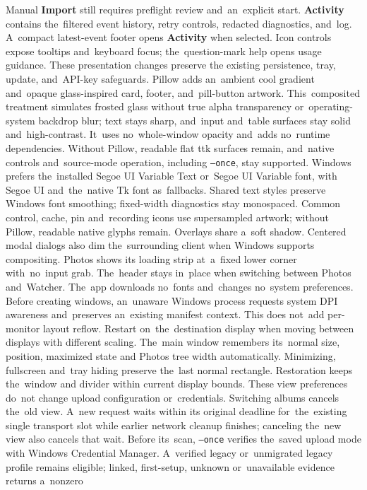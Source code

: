 \documentclass[11pt,a4paper]{article}
\newcommand{\ui}[1]{\textbf{#1}}
\begin{document}
Manual \ui{Import} still requires preflight review and~an~explicit start.
\ui{Activity} contains the~filtered event history, retry controls, redacted
diagnostics, and~log. A~compact latest-event footer opens \ui{Activity} when
selected. Icon controls expose tooltips and~keyboard focus; the~question-mark
help
opens usage guidance. These presentation changes preserve the
existing persistence, tray, update, and~API-key safeguards.
Pillow adds an~ambient cool gradient and~opaque glass-inspired card, footer,
and~pill-button artwork. This~composited treatment simulates frosted glass
without true alpha transparency or~operating-system backdrop blur; text stays
sharp, and~input and~table surfaces stay solid and~high-contrast. It~uses
no~whole-window
opacity and~adds no~runtime dependencies. Without Pillow, readable flat ttk
surfaces remain, and~native controls and~source-mode operation, including
\texttt{--once}, stay supported.
Windows prefers the~installed Segoe UI Variable Text or~Segoe UI Variable
font, with Segoe UI and~the~native Tk font as~fallbacks. Shared text styles preserve Windows
font smoothing; fixed-width diagnostics stay monospaced. Common control,
cache, pin and~recording icons use supersampled artwork; without Pillow,
readable native glyphs remain. Overlays share a~soft shadow. Centered modal
dialogs also dim the~surrounding client when Windows supports compositing.
Photos shows its loading strip at~a~fixed lower corner with~no~input grab.
The~header stays in~place when switching between Photos and~Watcher.
The~app downloads no~fonts and~changes
no~system preferences. Before creating windows, an~unaware Windows process
requests system DPI awareness and~preserves an~existing manifest context.
This does not~add per-monitor layout reflow. Restart on~the~destination
display when moving between displays with different scaling.
The~main window remembers its~normal size, position, maximized state and
Photos tree width automatically. Minimizing, fullscreen and~tray hiding
preserve the~last normal rectangle. Restoration keeps the~window and
divider within current display bounds. These view preferences do~not
change upload configuration or~credentials.
Switching albums cancels the~old view. A~new request waits within its
original deadline for~the~existing single transport slot while earlier
network cleanup finishes; canceling the~new view also cancels that wait.
Before its~scan, \texttt{--once} verifies the~saved upload mode with Windows
Credential Manager. A~verified legacy or~unmigrated legacy profile remains
eligible; linked, first-setup, unknown or~unavailable evidence returns a~nonzero
\end{document}
